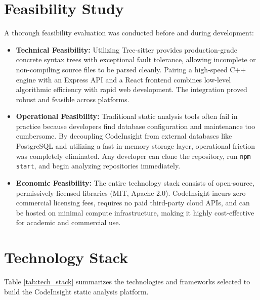 \section{Feasibility Study}
A thorough feasibility evaluation was conducted before and during development:
\begin{itemize}
    \item \textbf{Technical Feasibility:} Utilizing Tree-sitter provides production-grade concrete syntax trees with exceptional fault tolerance, allowing incomplete or non-compiling source files to be parsed cleanly. Pairing a high-speed C++ engine with an Express API and a React frontend combines low-level algorithmic efficiency with rapid web development. The integration proved robust and feasible across platforms.
    \item \textbf{Operational Feasibility:} Traditional static analysis tools often fail in practice because developers find database configuration and maintenance too cumbersome. By decoupling CodeInsight from external databases like PostgreSQL and utilizing a fast in-memory storage layer, operational friction was completely eliminated. Any developer can clone the repository, run \texttt{npm start}, and begin analyzing repositories immediately.
    \item \textbf{Economic Feasibility:} The entire technology stack consists of open-source, permissively licensed libraries (MIT, Apache 2.0). CodeInsight incurs zero commercial licensing fees, requires no paid third-party cloud APIs, and can be hosted on minimal compute infrastructure, making it highly cost-effective for academic and commercial use.
\end{itemize}

\section{Technology Stack}
Table \ref{tab:tech_stack} summarizes the technologies and frameworks selected to build the CodeInsight static analysis platform.

